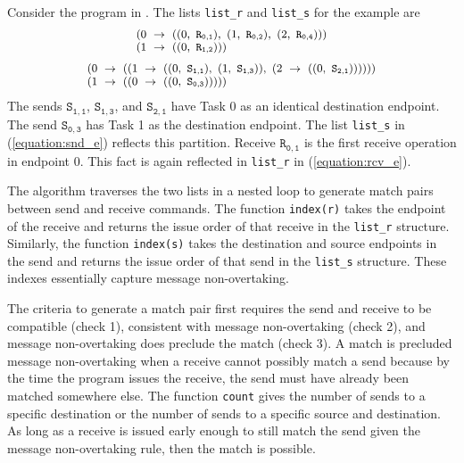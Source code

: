 Consider the program in . The lists \texttt{list\_r} and \texttt{list\_s} for the example are
\begin{equation}
\footnotesize \begin{array}{l}
(0\ \rightarrow\ ((0,\ \mathtt{R_{0,1}}),\ (1,\ \mathtt{R_{0,2}}),\ (2,\ \mathtt{R_{0,4}})))\\
(1\ \rightarrow\ ((0,\ \mathtt{R_{1,2}})))\\
\end{array}
\label{equation:rcv_e}
\end{equation}
\begin{equation}
\footnotesize \begin{array}{l}
(0\ \rightarrow\ ((1\ \rightarrow\ ((0,\ \mathtt{S_{1,1}}),\ (1,\ \mathtt{S_{1,3}})),\ (2\ \rightarrow\ ((0,\ \mathtt{S_{2,1}}))))))\\
(1\ \rightarrow\ ((0\ \rightarrow\ ((0,\ \mathtt{S_{0,3}})))))\\
\end{array}
\label{equation:snd_e}
\end{equation}
The sends $\mathtt{S_{1,1}}$, $\mathtt{S_{1,3}}$, and
$\mathtt{S_{2,1}}$ have Task 0 as an identical destination
endpoint. The send $\mathtt{S_{0,3}}$ has Task 1 as the destination
endpoint. The list \texttt{list\_s} in (\ref{equation:snd_e}) reflects
this partition.  Receive $\mathtt{R_{0,1}}$ is the first receive
operation in endpoint 0. This fact is again reflected
in \texttt{list\_r} in (\ref{equation:rcv_e}).

The algorithm traverses the two lists in a nested loop to generate
match pairs between send and receive commands. The
function \texttt{index(r)} takes the endpoint of the receive and
returns the issue order of that receive in the \texttt{list\_r}
structure. Similarly, the function \texttt{index(s)} takes the
destination and source endpoints in the send and returns the issue
order of that send in the \texttt{list\_s} structure. These indexes
essentially capture message non-overtaking.

The criteria to generate a match pair first requires the send and
receive to be compatible (check 1), consistent with message
non-overtaking (check 2), and message non-overtaking does preclude the
match (check 3). A match is precluded message non-overtaking when a
receive cannot possibly match a send because by the time the program
issues the receive, the send must have already been matched somewhere
else. The function \texttt{count} gives the number of sends to a
specific destination or the number of sends to a specific source and
destination.  As long as a receive is issued early enough to still
match the send given the message non-overtaking rule, then the match
is possible.

